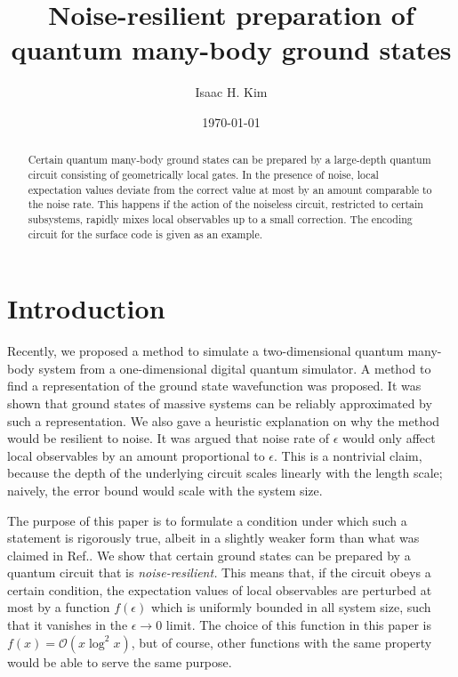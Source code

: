 \documentclass[prx,aps,amsmath,amssymb,floatfix,superscriptaddress,11pt,tightenlines,longbibliography,onecolumn,notitlepage]{revtex4-1}
\begin{document}
\title{Noise-resilient preparation of quantum many-body ground states}
\author{Isaac H. Kim}
\date{\today}

\begin{abstract}
  Certain quantum many-body ground states can be prepared by a large-depth quantum circuit consisting of geometrically local gates. In the presence of noise, local expectation values deviate from the correct value at most by an amount comparable to the noise rate. This happens if the action of the noiseless circuit, restricted to certain subsystems, rapidly mixes local observables up to a small correction. The encoding circuit for the surface code is given as an example.
\end{abstract}
\maketitle
\section{Introduction\label{section:Introduction}}
Recently, we proposed a method to simulate a two-dimensional quantum many-body system from a one-dimensional digital quantum simulator\cite{Kim2017a}. A method to find a representation of the ground state wavefunction was proposed. It was shown that ground states of massive systems can be reliably approximated by such a representation. We also gave a heuristic explanation on why the method would be resilient to noise. It was argued that noise rate of $\epsilon$ would only affect local observables by an amount proportional to $\epsilon$. This is a nontrivial claim, because the depth of the underlying circuit scales linearly with the length scale; naively, the error bound would scale with the system size.

The purpose of this paper is to formulate a condition under which such a statement is rigorously true, albeit in a slightly weaker form than what was claimed in Ref.\cite{Kim2017a}. We show that certain ground states can be prepared by a quantum circuit that is \emph{noise-resilient.} This means that, if the circuit obeys a certain condition, the expectation values of local observables are perturbed at most by a function $f(\epsilon)$ which is uniformly bounded in all system size, such that it vanishes in the $\epsilon \to 0$ limit. The choice of this function in this paper is $f(x) = \mathcal{O}(x\log^2 x)$, but of course, other functions with the same property would be able to serve the same purpose.
\end{document}
